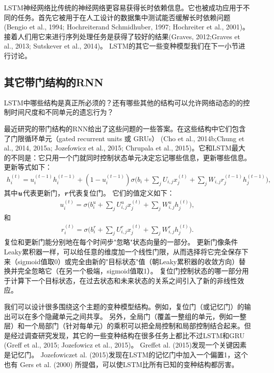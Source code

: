 LSTM神经网络比传统的神经网络更容易获得长时依赖信息。它也被成功应用于不同的任务。首先它被用于在人工设计的数据集中测试能否缓解长时依赖问题(Bengio et al., 1994; Hochreiterand Schmidhuber, 1997; Hochreiter et al., 2001)。接着人们用它来进行序列处理任务是获得了较好的结果(Graves, 2012;Graves et al., 2013; Sutskever et al., 2014)。 LSTM的其它一些变种模型我们在下一小节进行讨论。


\subsection{其它带门结构的RNN}
\label{sec:10.10.2}
LSTM中哪些结构是真正所必须的？还有哪些其他的结构可以允许网络动态的的控制时间尺度和不同单元的遗忘行为？

最近研究的带门结构的RNN给出了这些问题的一些答案。在这些结构中它们包含了门限循环单元（gated recurrent units 或 GRUs） (Cho et al., 2014b;Chung et al., 2014, 2015a; Jozefowicz et al., 2015; Chrupala et al., 2015)。它和LSTM最大的不同是：它只用一个门就同时控制状态单元决定忘记哪些信息，更新哪些信息。更新等式如下：
\begin{align}
 h_i^{(t)} = u_i^{(t-1)} h_i^{(t-1)} + (1 - u_i^{(t-1)}) \sigma 
 \Big( b_i + \sum_j U_{i,j} x_j^{(t)} + \sum_j W_{i,j} r_j^{(t-1)} h_j^{(t-1)} \Big),
\end{align}
其中$\boldsymbol{\mathit{u}}$代表更新门，$\boldsymbol{\mathit{r}}$代表复位门。
它们的值定义如下：
\begin{align}
 u_i^{(t)} = \sigma \Big( b_i^u + \sum_j U_{i,j}^u x_j^{(t)} + \sum_j W_{i,j}^u h_j^{(t)} \Big),
\end{align}
和
\begin{align}
 r_i^{(t)} = \sigma \Big( b_i^r + \sum_j U_{i,j}^r x_j^{(t)} + \sum_j W_{i,j}^r h_j^{(t)} \Big).
\end{align}
复位和更新门能分别地在每个时间步"忽略"状态向量的一部分。
更新门像条件Leaky累积器一样，可以给任意的维度加一个线性门限，从而选择将它完全保存下来（sigmoid值取0）或完全由新的"目标状态"值（朝Leaky累积器的收敛方向）替换并完全忽略它（在另一个极端，sigmoid值取1）。
复位门控制状态的哪一部分用于计算下一个目标状态，在过去状态和未来状态的关系之间引入了新的非线性效应。

我们可以设计很多围绕这个主题的变种模型结构。例如，复位门（或记忆门）的输出可以在多个隐藏单元之间共享。
另外，全局门（覆盖一整组的单元，例如一整层）和一个局部门（针对每单元）的乘积可以把全局控制和局部控制结合起来。但是经过调查研究发现，其它的一些变种结构在很多任务上都比不过LSTM和GRU (Greﬀ et al., 2015; Jozefowicz et al., 2015)。 Greﬀet al. (2015)发现一个关键因素是记忆门。 Jozefowiczet al. (2015)发现在LSTM的记忆门中加入一个偏置1，这个也有 Gers et al. (2000) 所提倡，可以使LSTM比所有已知的变种结构都厉害。


